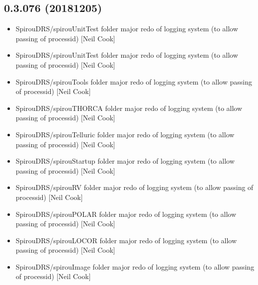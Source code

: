 \documentclass[a4paper,10pt,english]{report}
\begin{document}
\subsection{0.3.076 (2018\sphinxhyphen{}12\sphinxhyphen{}05)}
\label{\detokenize{misc/changelog:id266}}\begin{itemize}
\item {} 
SpirouDRS/spirouUnitTest folder \sphinxhyphen{} major redo of logging system (to
allow passing of process\sphinxhyphen{}id) {[}Neil Cook{]}

\item {} 
SpirouDRS/spirouUnitTest folder \sphinxhyphen{} major redo of logging system (to
allow passing of process\sphinxhyphen{}id) {[}Neil Cook{]}

\item {} 
SpirouDRS/spirouTools folder \sphinxhyphen{} major redo of logging system (to allow
passing of process\sphinxhyphen{}id) {[}Neil Cook{]}

\item {} 
SpirouDRS/spirouTHORCA folder \sphinxhyphen{} major redo of logging system (to allow
passing of process\sphinxhyphen{}id) {[}Neil Cook{]}

\item {} 
SpirouDRS/spirouTelluric folder \sphinxhyphen{} major redo of logging system (to
allow passing of process\sphinxhyphen{}id) {[}Neil Cook{]}

\item {} 
SpirouDRS/spirouStartup folder \sphinxhyphen{} major redo of logging system (to
allow passing of process\sphinxhyphen{}id) {[}Neil Cook{]}

\item {} 
SpirouDRS/spirouRV folder \sphinxhyphen{} major redo of logging system (to allow
passing of process\sphinxhyphen{}id) {[}Neil Cook{]}

\item {} 
SpirouDRS/spirouPOLAR folder \sphinxhyphen{} major redo of logging system (to allow
passing of process\sphinxhyphen{}id) {[}Neil Cook{]}

\item {} 
SpirouDRS/spirouLOCOR folder \sphinxhyphen{} major redo of logging system (to allow
passing of process\sphinxhyphen{}id) {[}Neil Cook{]}

\item {} 
SpirouDRS/spirouImage folder \sphinxhyphen{} major redo of logging system (to allow
passing of process\sphinxhyphen{}id) {[}Neil Cook{]}


\end{itemize}
\end{document}
